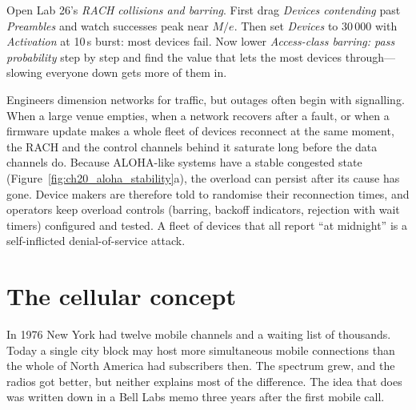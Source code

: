 \begin{tryit}
Open Lab 26's \emph{RACH collisions and barring}. First drag \emph{Devices contending} past
\emph{Preambles} and watch successes peak near $M/e$. Then set \emph{Devices} to 30\,000 with
\emph{Activation} at 10\,s burst: most devices fail. Now lower \emph{Access-class barring: pass probability}
step by step and find the value that lets the most devices through---slowing everyone down gets more of
them in.
\end{tryit}

\begin{pitfall}
Engineers dimension networks for traffic, but outages often begin with signalling. When a large venue empties,
when a network recovers after a fault, or when a firmware update makes a whole fleet of devices reconnect at the
same moment, the RACH and the control channels behind it saturate long before the data channels do. Because
ALOHA-like systems have a stable congested state (Figure~\ref{fig:ch20_aloha_stability}a), the overload can
persist after its cause has gone. Device makers are therefore told to randomise their reconnection times, and
operators keep overload controls (barring, backoff indicators, rejection with wait timers) configured and tested.
A fleet of devices that all report ``at midnight'' is a self-inflicted denial-of-service attack.
\end{pitfall}

\section{The cellular concept}
\label{sec:ch20:cellular}

In 1976 New York had twelve mobile channels and a waiting list of thousands. Today a single city block
may host more simultaneous mobile connections than the whole of North America had subscribers then.
The spectrum grew, and the radios got better, but neither explains most of the difference. The idea
that does was written down in a Bell Labs memo three years after the first mobile call.


